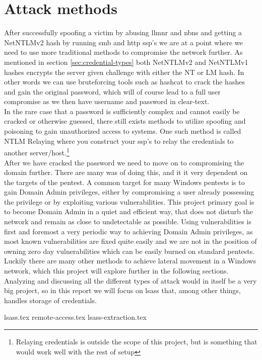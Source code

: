\documentclass{article}
\begin{document}
\section{Attack methods}
After successfully spoofing a victim by abusing \gls{llmnr} and \gls{nbns} and getting a NetNTLMv2 hash by running \gls{smb} and \gls{http} \gls{ssp}'s we are at a point where we need to use more traditional methods to compromise the network further. As mentioned in section \ref{sec:credential-types} both NetNTLMv2 and NetNTLMv1 hashes encrypts the server given challenge with either the NT or LM hash. In other words we can use bruteforcing tools such as hashcat\cite{url:hashes:hashcat-example-hashes} to crack the hashes and gain the original password, which will of course lead to a full user compromise as we then have username and password in clear-text.
\\
In the rare case that a password is sufficiently complex and cannot easily be cracked or otherwise guessed, there still exists methods to utilize spoofing and poisoning to gain unauthorized access to systems. One such method is called NTLM Relaying\cite{url:ntlm-relaying} where you construct your \gls{ssp}'s to relay the credentials to another server/host.\footnote{Relaying credentials is outside the scope of this project, but is something that would work well with the rest of setup}
\\
After we have cracked the password we need to move on to compromising the domain further. There are many was of doing this, and it it very dependent on the targets of the pentest. A common target for many Windows pentests is to gain Domain Admin privileges, either by compromising a user already possessing the privilege or by exploiting various vulnerabilities. This project primary goal is to become Domain Admin in a quiet and efficient way, that does not disturb the network and remain as close to undetectable as possible. Using vulnerabilities is first and foremost a very periodic way to achieving Domain Admin privileges, as most known vulnerabilities are fixed quite easily and we are not in the position of owning zero day vulnerabilities which can be easily burned on standard pentests. Luckily there are many other methods to achieve lateral movement in a Windows network, which this project will explore further in the following sections. Analyzing and discussing all the different types of attack would in itself be a very big project, so in this report we will focus on \gls{lsass} that, among other things, handles storage of credentials.

{lsass.tex}
{remote-access.tex}
{lsass-extraction.tex}
\end{document}
